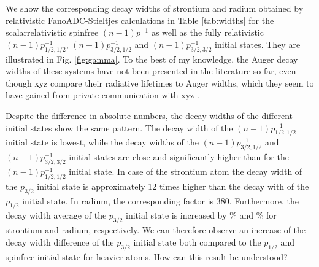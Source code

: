 

We show the corresponding decay
widths of strontium and radium obtained by relativistic FanoADC-Stieltjes
calculations in Table \ref{tab:widths}
for the scalarrelativistic spinfree $(n-1)p^{-1}$ as well as the
fully relativistic $(n-1)p_{1/2,1/2}^{-1}$, $(n-1)p_{3/2,1/2}^{-1}$ and
$(n-1)p_{3/2,3/2}^{-1}$ initial states. They are illustrated in Fig. \ref{fig:gamma}.
To the best of my knowledge, the Auger decay widths of these systems have
not been presented in the literature so far, even though xyz compare their
radiative lifetimes to Auger widths, which they seem to have gained
from private communication with xyz \cite{}.

Despite the difference in absolute numbers, the decay widths
of the different initial states show the same pattern. The decay width of
the $(n-1)p_{1/2,1/2}^{-1}$ initial state is lowest, while the decay widths
of the $(n-1)p_{3/2,1/2}^{-1}$ and
$(n-1)p_{3/2,3/2}^{-1}$ initial states are close and significantly higher than
for the $(n-1)p_{1/2,1/2}^{-1}$ initial state.
In case of the strontium atom the decay width of the $p_{3/2}$ initial state
is approximately 12 times higher than the decay with of the $p_{1/2}$ initial state.
In radium, the corresponding factor is 380.
Furthermore, the decay width average of the $p_{3/2}$ initial state is increased 
by \unit[114]{\%} and \unit[236]{\%} for strontium and radium, respectively.
We can therefore observe an increase
of the decay width difference of the $p_{3/2}$ initial state both
compared to the $p_{1/2}$ and spinfree initial state for heavier atoms.
How can this result be understood?

